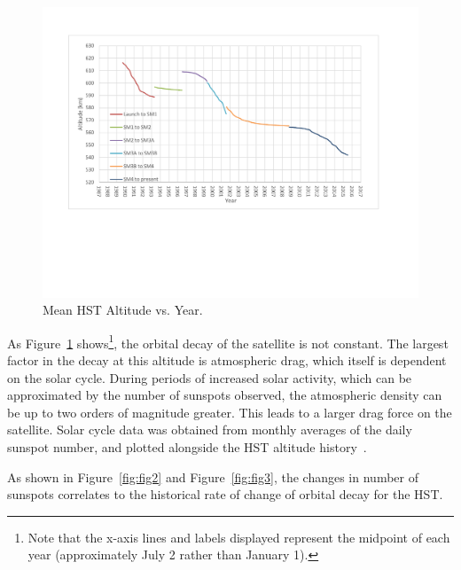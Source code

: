\documentclass[paper=letter, fontsize=11pt]{scrartcl} %
\numberwithin{equation}{section} %
\numberwithin{figure}{section} %
\numberwithin{table}{section} %
\begin{document}
\begin{figure}[H]
\begin{center}
\includegraphics[width=1\textwidth]{figs2/1.pdf}
\caption{Mean HST Altitude vs. Year.}
\label{fig:fig1}
\end{center}
\end{figure}

As Figure~\ref{fig:fig1} shows\footnote{Note that the x-axis lines and labels displayed represent the midpoint of each year (approximately July 2 rather than January 1).}, the orbital decay of the satellite is not constant. The largest factor in the decay at this altitude is atmospheric drag, which itself is dependent on the solar cycle. During periods of increased solar activity, which can be approximated by the number of sunspots observed, the atmospheric density can be up to two orders of magnitude greater. This leads to a larger drag force on the satellite. Solar cycle data was obtained from monthly averages of the daily sunspot number, and plotted alongside the HST altitude history~\cite{sunspots}.

As shown in Figure~\ref{fig:fig2} and Figure~\ref{fig:fig3}, the changes in number of sunspots correlates to the historical rate of change of orbital decay for the HST.
\end{document}
